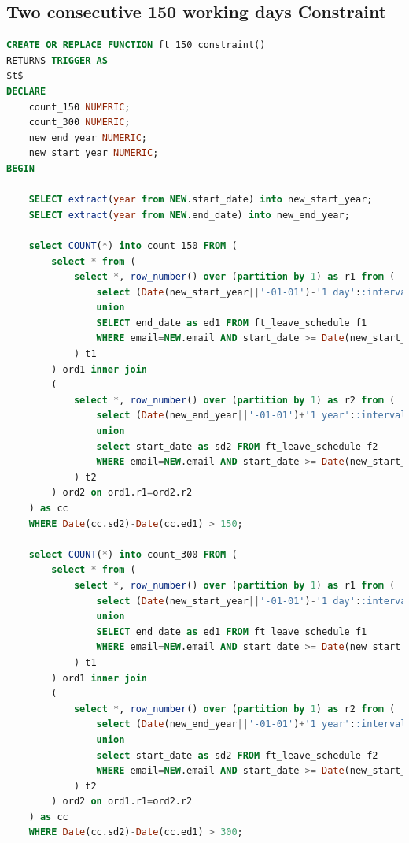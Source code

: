 \documentclass[
  paper=a4,
  ,captions=tableheading
]{scrartcl}
\begin{document}
\hypertarget{two-consecutive-150-working-days-constraint}{%
\subsection{Two consecutive 150 working days
Constraint}\label{two-consecutive-150-working-days-constraint}}

\begin{lstlisting}[language=SQL]
CREATE OR REPLACE FUNCTION ft_150_constraint()
RETURNS TRIGGER AS
$t$
DECLARE
    count_150 NUMERIC;
    count_300 NUMERIC;
    new_end_year NUMERIC;
    new_start_year NUMERIC;
BEGIN

    SELECT extract(year from NEW.start_date) into new_start_year;
    SELECT extract(year from NEW.end_date) into new_end_year;

    select COUNT(*) into count_150 FROM (
        select * from (
            select *, row_number() over (partition by 1) as r1 from (
                select (Date(new_start_year||'-01-01')-'1 day'::interval) as ed1
                union
                SELECT end_date as ed1 FROM ft_leave_schedule f1
                WHERE email=NEW.email AND start_date >= Date(new_start_year||'-01-01') order by ed1 ASC
            ) t1
        ) ord1 inner join
        (
            select *, row_number() over (partition by 1) as r2 from (
                select (Date(new_end_year||'-01-01')+'1 year'::interval) as sd2
                union
                select start_date as sd2 FROM ft_leave_schedule f2
                WHERE email=NEW.email AND start_date >= Date(new_start_year||'-01-01') order by sd2 ASC
            ) t2
        ) ord2 on ord1.r1=ord2.r2
    ) as cc
    WHERE Date(cc.sd2)-Date(cc.ed1) > 150;

    select COUNT(*) into count_300 FROM (
        select * from (
            select *, row_number() over (partition by 1) as r1 from (
                select (Date(new_start_year||'-01-01')-'1 day'::interval) as ed1
                union
                SELECT end_date as ed1 FROM ft_leave_schedule f1
                WHERE email=NEW.email AND start_date >= Date(new_start_year||'-01-01') order by ed1 ASC
            ) t1
        ) ord1 inner join
        (
            select *, row_number() over (partition by 1) as r2 from (
                select (Date(new_end_year||'-01-01')+'1 year'::interval) as sd2
                union
                select start_date as sd2 FROM ft_leave_schedule f2
                WHERE email=NEW.email AND start_date >= Date(new_start_year||'-01-01') order by sd2 ASC
            ) t2
        ) ord2 on ord1.r1=ord2.r2
    ) as cc
    WHERE Date(cc.sd2)-Date(cc.ed1) > 300;


\end{lstlisting}
\end{document}
